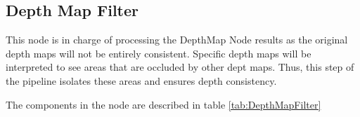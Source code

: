 \documentclass[12pt]{report}
\begin{document}
\subsection{Depth Map Filter}
This node is in charge of processing the DepthMap Node results as the original depth maps will not be entirely consistent.
Specific depth maps will be interpreted to see areas that are occluded by other dept maps. Thus, this step of the pipeline isolates these areas and ensures depth consistency.

The components in the node are described in table \ref{tab:DepthMapFilter}

\end{document}

